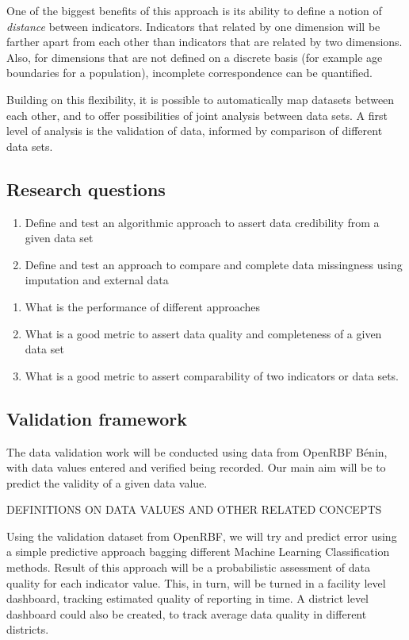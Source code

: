 \documentclass[a4paper,11pt,final,twoside]{article}
\begin{document}
One of the biggest benefits of this approach is its ability to define a notion of \textit{distance} between indicators. Indicators that related by one dimension will be farther apart from each other than indicators that are related by two dimensions. Also, for dimensions that are not defined on a discrete basis (for example age boundaries for a population), incomplete correspondence can be quantified.

Building on this flexibility, it is possible to automatically map datasets between each other, and to offer possibilities of joint analysis between data sets. A first level of analysis is the validation of data, informed by comparison of different data sets.

\subsection{Research questions}

\begin{enumerate}
\item Define and test an algorithmic approach to assert data credibility from a given data set
\item Define and test an approach to compare and complete data missingness using imputation and external data
\end{enumerate}

\begin{enumerate}
\item What is the performance of different approaches
\item What is a good metric to assert data quality and completeness of a given data set
\item What is a good metric to assert comparability of two indicators or data sets.
\end{enumerate}

\subsection{Validation framework}

The data validation work will be conducted using data from OpenRBF Bénin, with data values entered and verified being recorded. Our main aim will be to predict the validity of a given data value.

DEFINITIONS ON DATA VALUES AND OTHER RELATED CONCEPTS

Using the validation dataset from OpenRBF, we will try and predict error using a simple predictive approach bagging different Machine Learning Classification methods. Result of this approach will be a probabilistic assessment of data quality for each indicator value. This, in turn, will be turned in a facility level dashboard, tracking estimated quality of reporting in time. A district level dashboard could also be created, to track average data quality in different districts.
\end{document}

